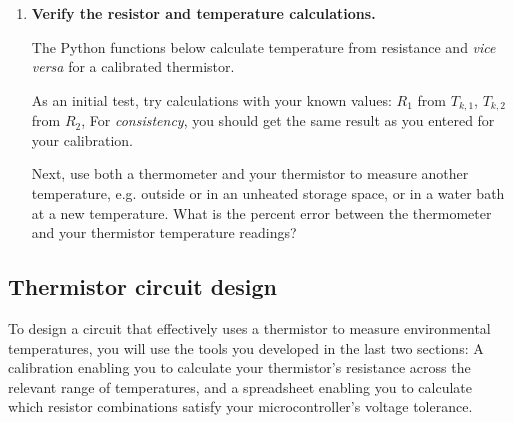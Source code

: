 \begin{enumerate}
	\item \textbf{Verify the resistor and temperature calculations.}

	The Python functions below calculate temperature from resistance and \textit{vice versa} for a calibrated thermistor.
	
	As an initial test, try calculations with your known values: $R_1$ from $T_{k,1}$, $T_{k,2}$ from $R_2$, \etc
	For \emph{consistency}, you should get the same result as you entered for your calibration.

	\smallskip
	Next, use both a thermometer and your thermistor to measure another temperature, e.g. outside or in an unheated storage space, or in a water bath at a new temperature.
	What is the percent error between the thermometer and your thermistor temperature readings?

\end{enumerate}


\subsection{Thermistor circuit design}
To design a circuit that effectively uses a thermistor to measure environmental temperatures, you will use the tools you developed in the last two sections: A calibration enabling you to calculate your thermistor's resistance across the relevant range of temperatures, and a spreadsheet enabling you to calculate which resistor combinations satisfy your microcontroller's \adc voltage tolerance.

